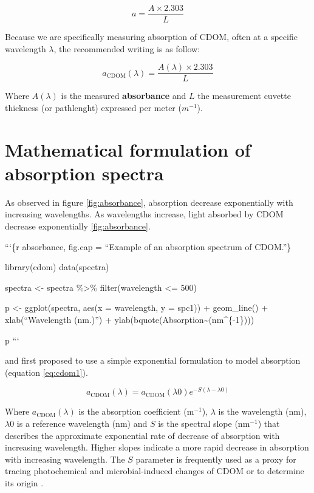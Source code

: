 \documentclass[]{book}
\theoremstyle{definition}
\theoremstyle{definition}
\theoremstyle{remark}
\begin{document}
\begin{equation}

a = \frac{A \times 2.303}{L}
\label{eq:absorption1}

\end{equation}

Because we are specifically measuring absorption of CDOM, often at a
specific wavelength \(\lambda\), the recommended writing is as follow:

\begin{equation}

a_{\text{CDOM}}(\lambda) = \frac{A(\lambda) \times 2.303}{L}
\label{eq:absorption2}

\end{equation}

Where \(A(\lambda)\) is the measured \textbf{absorbance} and \(L\) the
measurement cuvette thickness (or pathlenght) expressed per meter
(\(m^{-1}\)).

\section{Mathematical formulation of absorption
spectra}\label{mathematical-formulation-of-absorption-spectra}

As observed in figure \ref{fig:absorbance}, absorption decrease
exponentially with increasing wavelengths. As wavelengths increase,
light absorbed by CDOM decrease exponentially \ref{fig:absorbance}.

```\{r absorbance, fig.cap = ``Example of an absorption spectrum of
CDOM.''\}

library(cdom) data(spectra)

spectra \textless{}- spectra \%\textgreater{}\% filter(wavelength
\textless{}= 500)

p \textless{}- ggplot(spectra, aes(x = wavelength, y = spc1)) +
geom\_line() + xlab(``Wavelength (nm.)'') +
ylab(bquote(Absorption\textasciitilde{}(nm\^{}\{-1\})))

p ```

\citet{Jerlov1968} and \citet{Bricaud1981} first proposed to use a
simple exponential formulation to model absorption (equation
\eqref{eq:cdom1}).

\begin{equation}
a_{\text{CDOM}}(\lambda) = a_{\text{CDOM}}(\lambda0)e^{-S(\lambda - \lambda0)}
\label{eq:cdom1}
\end{equation}

Where \(a_{\text{CDOM}}(\lambda)\) is the absorption coefficient
(m\(^{-1}\)), \(\lambda\) is the wavelength (nm), \(\lambda0\) is a
reference wavelength (nm) and \(S\) is the spectral slope (nm\(^{-1}\))
that describes the approximate exponential rate of decrease of
absorption with increasing wavelength. Higher slopes indicate a more
rapid decrease in absorption with increasing wavelength. The \(S\)
parameter is frequently used as a proxy for tracing photochemical and
microbial-induced changes of CDOM
\citep{Moran2000, Twardowski2004, Helms2013} or to determine its origin
\citep{Stedmon2001}.
\end{document}
